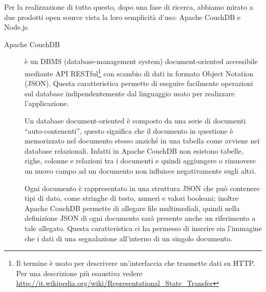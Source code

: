         Per la realizzazione di tutto questo, dopo una fase di ricerca, abbiamo
        mirato a due prodotti open source vista la loro semplicità d'uso:
        Apache CouchDB\texttrademark{} e Node.js.
        \begin{description}
            \item[Apache CouchDB\texttrademark{}] è un DBMS (database-management
                system) doc\-u\-ment-ori\-ented accessibile mediante API RESTful\footnote{Il termine è usato
                per descrivere un'interfaccia che trasmette dati su HTTP. Per una
                descrizione più esaustiva vedere
                \url{http://it.wikipedia.org/wiki/Representational_State_Transfer}}
                con scambio di dati in formato \js{} Object Notation (JSON). Questa
                caratteristica permette di eseguire facilmente operazioni sul database
                indipendentemente dal linguaggio usato per realizzare l'applicazione.

                Un database document-oriented è composto da una serie di documenti
                ``auto-contenenti'', questo significa che il documento in
                questione è memorizzato nel documento stesso anziché in una tabella
                come avviene nei database relazionali. Infatti in Apache CouchDB\texttrademark{}
                non esistono tabelle, righe, colonne e relazioni tra i
                documenti e quindi aggiungere o rimuovere un nuovo
                campo ad un documento non influisce negativamente sugli altri.

                Ogni documento è rappresentato in una struttura JSON che può
                contenere tipi di dato, come stringhe di testo, numeri e valori
                booleani; inoltre Apache CouchDB\texttrademark{} permette
                di allegare file multimediali, quindi nella
                definizione JSON di ogni documento sarà presente anche un riferimento a tale allegato.
                Questa caratteristica ci ha permesso di inserire sia l'immagine che
                i dati di una segnalazione all'interno di un singolo documento.


\end{description}
